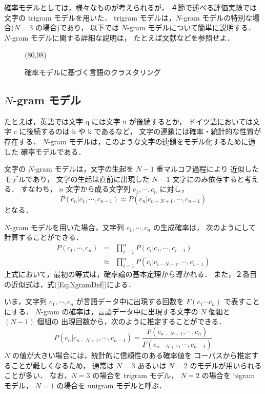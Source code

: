 確率モデルとしては，様々なものが考えられるが，
４節で述べる評価実験では文字の trigram モデルを用いた．
trigram モデルは，$N$-gram モデルの特別な場合($N=3$ の場合)であり，
以下では $N$-gram モデルについて簡単に説明する．
$N$-gram モデルに関する詳細な説明は，
たとえば文献\cite{Jelinek90,Kita96Book}などを参照せよ．

\begin{figure}
\begin{center}
  \atari(80,98)
\end{center}
\caption{確率モデルに基づく言語のクラスタリング}
\label{Fig:OurApproach}
\end{figure}

\subsection{$N$-gram モデル}

たとえば，英語では文字 q には文字 u が後続するとか，
ドイツ語においては文字 c に後続するのは h や k であるなど，
文字の連鎖には確率・統計的な性質が存在する．
$N$-gram モデルは，このような文字の連鎖をモデル化するために適した
確率モデルである．

文字の $N$-gram モデルは，文字の生起を $N-1$ 重マルコフ過程により
近似したモデルであり，
文字の生起は直前に出現した $N-1$ 文字にのみ依存すると考える．
すなわち，
$n$ 文字から成る文字列 $c_{1}, \cdots ,c_{n}$ に対し，
\begin{equation}
        P(c_n|c_1, \cdots, c_{n-1}) \approx P(c_n|c_{n-N+1}, \cdots, c_{n-1})
        \label{Eq:NgramDef}
\end{equation}
となる．

$N$-gram モデルを用いた場合，文字列 $c_{1}, \cdots ,c_{n}$ の生成確率は，
次のようにして計算することができる．
\begin{eqnarray}
        P(c_1, \cdots, c_n) & = & \prod_{i=1}^{n} P(c_i|c_1, \cdots ,c_{i-1}) \nonumber\\
                & \approx & \prod_{i=1}^{n} P(c_i|c_{i-N+1}, \cdots, c_{i-1})
\end{eqnarray}
上式において，最初の等式は，確率論の基本定理から導かれる．
また，２番目の近似式は，式(\ref{Eq:NgramDef})による．

いま，文字列 $c_{1}, \cdots ,c_{n}$ が言語データ中に出現する回数を
$F(c_{1} \cdots c_{n})$ で表すことにする．
$N$-gram の確率は，言語データ中に出現する文字の $N$ 個組と $(N-1)$ 個組の
出現回数から，次のように推定することができる．
\begin{equation}
        P(c_n|c_{n-N+1}, \cdots, c_{n-1})
        = \frac{F(c_{n-N+1}, \cdots, c_n)}{F(c_{n-N+1}, \cdots, c_{n-1})}
        \label{Eq:NgramTraining}
\end{equation}
$N$ の値が大きい場合には，統計的に信頼性のある確率値を
コーパスから推定することが難しくなるため，
通常は $N=3$ あるいは $N=2$ のモデルが用いられることが多い．
なお，$N=3$ の場合を trigram モデル，
$N=2$ の場合を bigram モデル，
$N=1$ の場合を unigram モデルと呼ぶ．

